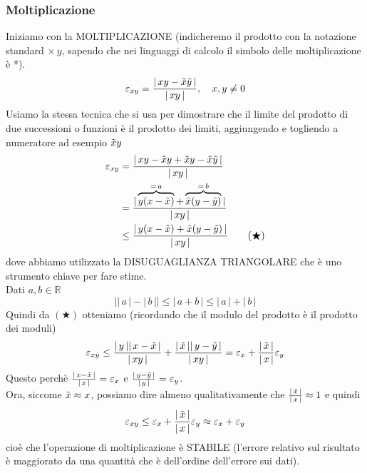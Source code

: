 \documentclass[12pt]{article}
\begin{document}
\subsubsection{Moltiplicazione}
Iniziamo con la MOLTIPLICAZIONE (indicheremo il prodotto con la notazione standard $\times \, y$, sapendo che nei linguaggi di calcolo il simbolo delle moltiplicazione è *).
\[ \varepsilon_{xy} = \frac{\lvert \, xy - \Tilde{x}\Tilde{y} \, \rvert}{\lvert \, xy \, \rvert}, \quad x , y \ne 0 \]
Usiamo la stessa tecnica che si usa per dimostrare che il limite del prodotto di due successioni o funzioni è il prodotto dei limiti, aggiungendo e togliendo a numeratore ad esempio $\Tilde{x}y$
\[\begin{split}
    \varepsilon_{xy} & = \frac{\lvert \, xy - \Tilde{x}y + \Tilde{x}y - \Tilde{x}\Tilde{y} \, \rvert}{\lvert \, xy \, \rvert} \\
    & = \frac{\lvert \, \overbrace{y(x - \Tilde{x})}^{=\,a} + \overbrace{\Tilde{x}(y - \Tilde{y})}^{=\,b} \, \rvert}{\lvert\, xy \, \rvert} \\
    & \le \frac{\lvert \, y(x - \Tilde{x}) + \Tilde{x}(y - \Tilde{y}) \, \rvert}{\lvert \, xy \, \rvert} \quad \quad (\bigstar) 
\end{split}\]
dove abbiamo utilizzato la DISUGUAGLIANZA TRIANGOLARE che è uno strumento chiave per fare stime.\\
Dati $a, b \in \mathbb{R}$
\[ \lvert \lvert \, a \, \rvert - \lvert \, b \, \rvert \rvert \le \lvert \, a + b \, \rvert \le \lvert \, a \, \rvert + \lvert \, b \, \rvert\] 
Quindi da $(\bigstar)$ otteniamo (ricordando che il modulo del prodotto è il prodotto dei moduli)
\[ \varepsilon_{xy} \le \frac{\lvert \,y\, \rvert \lvert \,x - \Tilde{x}\, \rvert}{\lvert \,xy\, \rvert} + \frac{\lvert \,\Tilde{x}\, \rvert \lvert \,y - \Tilde{y}\, \rvert}{\lvert \,xy\, \rvert} = \varepsilon_x + \frac{\lvert \,\Tilde{x}\, \rvert}{\lvert \,x\, \rvert} \varepsilon_y\]
Questo perchè $\frac{\lvert \,x - \Tilde{x}\, \rvert}{\lvert \,x\, \rvert} = \varepsilon_x$ e $\frac{\lvert \,y - \Tilde{y}\, \rvert}{\lvert \,y\, \rvert} = \varepsilon_y$.\\
Ora, siccome $\Tilde{x} \approx x$, possiamo dire almeno qualitativamente che $\frac{\lvert \,\Tilde{x}\, \rvert}{\lvert \,x\, \rvert} \approx 1$ e quindi 
\[ \varepsilon_{xy} \le \varepsilon_x + \frac{\lvert \,\Tilde{x}\, \rvert}{\lvert \,x\, \rvert} \varepsilon_y \approx \varepsilon_x + \varepsilon_y \]
cioè che l’operazione di moltiplicazione è STABILE (l’errore relativo sul risultato è maggiorato da una quantità che è dell'ordine dell'errore sui dati).\\
\end{document}
